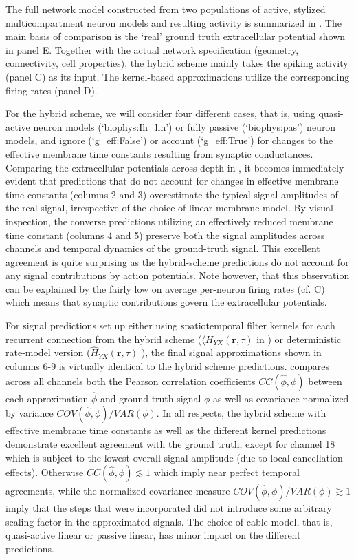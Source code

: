 The full network model constructed from two populations of active, stylized multicompartment neuron models and resulting activity is summarized in . 
The main basis of comparison is the `real' ground truth extracellular potential shown in panel E. 
Together with the actual network specification (geometry, connectivity, cell properties), 
the hybrid scheme mainly takes the spiking activity (panel C) as its input. 
The kernel-based approximations utilize the corresponding firing rates (panel D). 

For the hybrid scheme, 
we will consider four different cases, that is, using quasi-active neuron models (`biophys:Ih\_lin') or fully passive (`biophys:pas') neuron models, 
and ignore (`g\_eff:False') or account (`g\_eff:True') for changes to the effective membrane time constants resulting from synaptic conductances.  
Comparing the extracellular potentials across depth in ,
it becomes immediately evident that predictions that do not account for changes in effective membrane time constants (columns 2 and 3) overestimate the typical signal amplitudes of the real signal, 
irrespective of the choice of linear membrane model. 
By visual inspection, the converse predictions utilizing an effectively reduced membrane time constant (columns 4 and 5) preserve both the signal amplitudes across channels and temporal dynamics of the ground-truth signal. 
This excellent agreement is quite surprising as the hybrid-scheme predictions do not account for any signal contributions by action potentials. 
Note however, that this observation can be explained by the fairly low on average per-neuron firing rates (cf. C) which means that synaptic contributions govern the extracellular potentials.

For signal predictions set up either using spatiotemporal filter kernels for each recurrent connection from the hybrid scheme ($\langle H_{YX}(\mathbf{r}, \tau)$ in ) or deterministic rate-model version  ($\hat{H}_{YX}(\mathbf{r}, \tau)$ ), 
the final signal approximations shown in  columns 6-9 is virtually identical to the hybrid scheme predictions. 
 compares across all channels both the Pearson correlation coefficients $CC(\hat{\phi}, \phi)$ between each approximation $\hat{\phi}$ and ground truth signal $\phi$ as well as covariance normalized by variance $COV(\hat{\phi}, \phi)/VAR(\phi)$. 
In all respects, the hybrid scheme with effective membrane time constants as well as the different kernel predictions demonstrate excellent agreement with the ground truth, except for channel 18 which is subject to the lowest overall signal amplitude (due to local cancellation effects). 
Otherwise $CC(\hat{\phi}, \phi) \lesssim 1$ which imply near perfect temporal agreements, 
while the normalized covariance measure $COV(\hat{\phi}, \phi)/VAR(\phi) \gtrsim 1$ imply that the steps that were incorporated did not introduce some arbitrary scaling factor in the approximated signals. 
The choice of cable model, that is, quasi-active linear or passive linear, has minor impact on the different predictions.   


